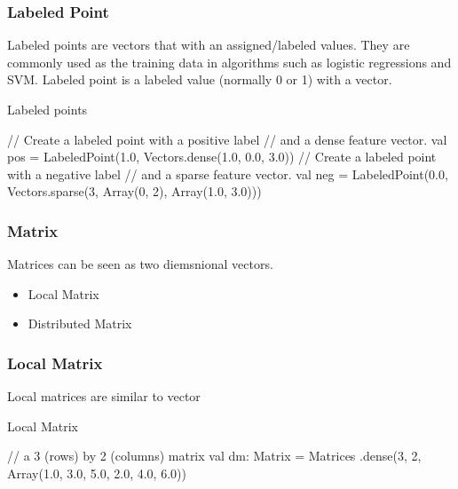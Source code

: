 \documentclass{beamer}
\newcommand{\beb}{\begin{exampleblock}}
\newcommand{\eeb}{\end{exampleblock}}
\begin{document}


\begin{frame}[fragile]
\frametitle{Labeled Point}

Labeled points are vectors that with an assigned/labeled values. They
are commonly used as the training data in algorithms
such as logistic regressions and SVM. Labeled point is a labeled value
(normally 0 or 1) with a vector.
\beb{Labeled points}
\begin{code}
// Create a labeled point with a positive label 
// and a dense feature vector.
val pos = LabeledPoint(1.0, Vectors.dense(1.0, 0.0, 3.0))
// Create a labeled point with a negative label 
// and a sparse feature vector.
val neg = LabeledPoint(0.0, 
  Vectors.sparse(3, Array(0, 2), Array(1.0, 3.0)))
\end{code}
\eeb
\end{frame}





\begin{frame}[fragile]
\frametitle{Matrix}


Matrices can be seen as two diemsnional vectors. 
\begin{itemize}
 \item Local Matrix
 \item Distributed Matrix
\end{itemize}
\end{frame}



\begin{frame}[fragile]
\frametitle{Local Matrix}

Local matrices are similar to vector
\beb{Local Matrix}
\begin{code}
// a 3 (rows) by 2 (columns) matrix
val dm: Matrix = Matrices
  .dense(3, 2, Array(1.0, 3.0, 5.0, 2.0, 4.0, 6.0))
\end{code}
\eeb
\end{frame}

\end{document}
